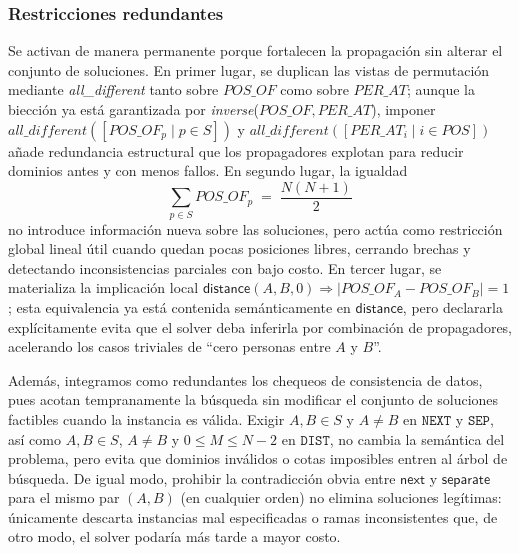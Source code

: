 \subsubsection*{Restricciones redundantes}
Se activan de manera permanente porque fortalecen la propagación sin alterar el conjunto de soluciones. En primer lugar, se duplican las vistas de permutación mediante \textit{all\_different} tanto sobre \(POS\_OF\) como sobre \(PER\_AT\); aunque la biección ya está garantizada por \textit{inverse}(\(POS\_OF,PER\_AT\)), imponer \(\textit{all\_different}([POS\_OF_p\mid p\in S])\) y \(\textit{all\_different}([PER\_AT_i\mid i\in POS])\) añade redundancia estructural que los propagadores explotan para reducir dominios antes y con menos fallos. En segundo lugar, la igualdad
\[
\sum_{p\in S} POS\_OF_p \;=\; \frac{N(N+1)}{2}
\]
no introduce información nueva sobre las soluciones, pero actúa como restricción global lineal útil cuando quedan pocas posiciones libres, cerrando brechas y detectando inconsistencias parciales con bajo costo. En tercer lugar, se materializa la implicación local \(\textsf{distance}(A,B,0)\Rightarrow |POS\_OF_A-POS\_OF_B|=1\); esta equivalencia ya está contenida semánticamente en \(\textsf{distance}\), pero declararla explícitamente evita que el solver deba inferirla por combinación de propagadores, acelerando los casos triviales de “cero personas entre \(A\) y \(B\)”.

Además, integramos como redundantes los chequeos de consistencia de datos, pues acotan tempranamente la búsqueda sin modificar el conjunto de soluciones factibles cuando la instancia es válida. Exigir \(A,B\in S\) y \(A\neq B\) en \(\texttt{NEXT}\) y \(\texttt{SEP}\), así como \(A,B\in S\), \(A\neq B\) y \(0\le M\le N-2\) en \(\texttt{DIST}\), no cambia la semántica del problema, pero evita que dominios inválidos o cotas imposibles entren al árbol de búsqueda. De igual modo, prohibir la contradicción obvia entre \(\textsf{next}\) y \(\textsf{separate}\) para el mismo par \((A,B)\) (en cualquier orden) no elimina soluciones legítimas: únicamente descarta instancias mal especificadas o ramas inconsistentes que, de otro modo, el solver podaría más tarde a mayor costo.

